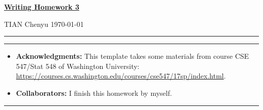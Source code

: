 \documentclass[a4paper]{article}
\begin{document}
\courseheader



\setcounter{hwcnt}{3} %

\begin{center}
  \underline{\bf Writing Homework 3}%
\end{center}
\begin{flushleft}
  TIAN Chenyu\hfill
  \today
\end{flushleft}
\hrule

\vspace{2em}

\flushleft
\rule{\textwidth}{1pt}
\begin{itemize}
\item {\bf Acknowledgments: \/} 
  This template takes some materials from course CSE 547/Stat 548 of Washington University: \small{\url{https://courses.cs.washington.edu/courses/cse547/17sp/index.html}}.
\item {\bf Collaborators: \/}
  I finish this homework by myself.
\end{itemize}
\rule{\textwidth}{1pt}

\vspace{2em}

\end{document}
